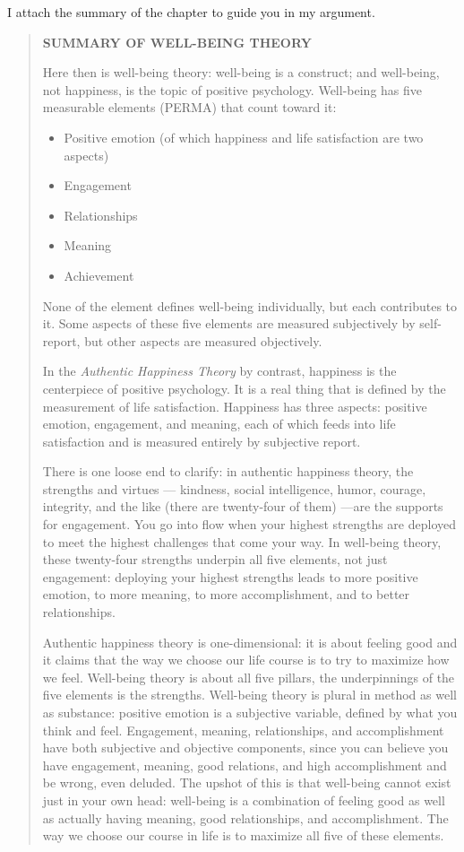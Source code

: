 \documentclass[]{book}
\begin{document}
I attach the summary of the chapter to guide you in my argument.

\begin{quote}
\textbf{SUMMARY OF WELL-BEING THEORY}

Here then is well-being theory: well-being is a construct; and well-being, not happiness, is the topic of positive psychology. Well-being has five measurable elements (PERMA) that count toward it:

\begin{itemize}
\item
  Positive emotion (of which happiness and life satisfaction are two aspects)
\item
  Engagement
\item
  Relationships
\item
  Meaning
\item
  Achievement
\end{itemize}

None of the element defines well-being individually, but each contributes to it. Some aspects of these five elements are measured subjectively by self-report, but other aspects are measured objectively.

In the \emph{Authentic Happiness Theory} by contrast, happiness is the centerpiece of positive psychology. It is a real thing that is defined by the measurement of life satisfaction. Happiness has three aspects: positive emotion, engagement, and meaning, each of which feeds into life satisfaction and is measured entirely by subjective report.

There is one loose end to clarify: in authentic happiness theory, the strengths and virtues --- kindness, social intelligence, humor, courage, integrity, and the like (there are twenty-four of them) ---are the supports for engagement. You go into flow when your highest strengths are deployed to meet the highest challenges that come your way. In well-being theory, these twenty-four strengths underpin all five elements, not just engagement: deploying your highest strengths leads to more positive emotion, to more meaning, to more accomplishment, and to better relationships.

Authentic happiness theory is one-dimensional: it is about feeling good and it claims that the way we choose our life course is to try to maximize how we feel. Well-being theory is about all five pillars, the underpinnings of the five elements is the strengths. Well-being theory is plural in method as well as substance: positive emotion is a subjective variable, defined by what you think and feel. Engagement, meaning, relationships, and accomplishment have both subjective and objective components, since you can believe you have engagement, meaning, good relations, and high accomplishment and be wrong, even deluded. The upshot of this is that well-being cannot exist just in your own head: well-being is a combination of feeling good as well as actually having meaning, good relationships, and accomplishment. The way we choose our course in life is to maximize all five of these elements.


\end{quote}
\end{document}
